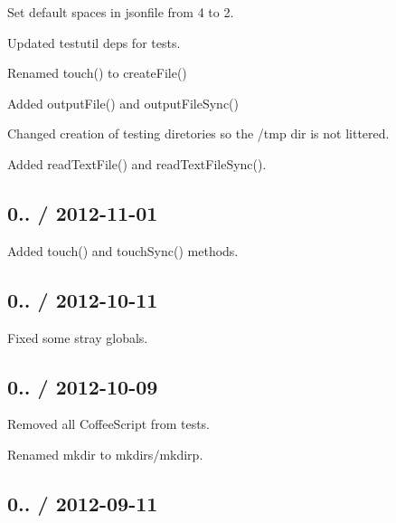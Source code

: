 \begin{DoxyItemize}
\item Set default spaces in {\ttfamily jsonfile} from 4 to 2.
\item Updated {\ttfamily testutil} deps for tests.
\item Renamed {\ttfamily touch()} to {\ttfamily create\+File()}
\item Added {\ttfamily output\+File()} and {\ttfamily output\+File\+Sync()}
\item Changed creation of testing diretories so the /tmp dir is not littered.
\item Added {\ttfamily read\+Text\+File()} and {\ttfamily read\+Text\+File\+Sync()}.
\end{DoxyItemize}

\subsection*{0.. / 2012-\/11-\/01 }


\begin{DoxyItemize}
\item Added {\ttfamily touch()} and {\ttfamily touch\+Sync()} methods.
\end{DoxyItemize}

\subsection*{0.. / 2012-\/10-\/11 }


\begin{DoxyItemize}
\item Fixed some stray globals.
\end{DoxyItemize}

\subsection*{0.. / 2012-\/10-\/09 }


\begin{DoxyItemize}
\item Removed all Coffee\+Script from tests.
\item Renamed {\ttfamily mkdir} to {\ttfamily mkdirs}/{\ttfamily mkdirp}.
\end{DoxyItemize}

\subsection*{0.. / 2012-\/09-\/11 }


